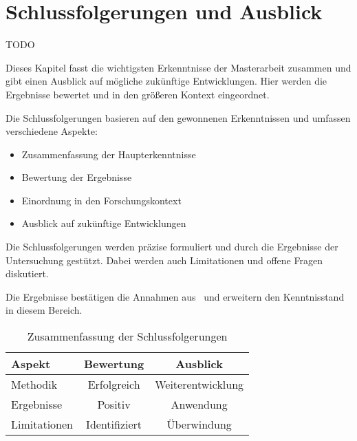 
\chapter{Schlussfolgerungen und Ausblick}\label{cha:conclusion}

TODO 

Dieses Kapitel fasst die wichtigsten Erkenntnisse der Masterarbeit zusammen und gibt einen Ausblick auf mögliche zukünftige Entwicklungen. 
Hier werden die Ergebnisse bewertet und in den größeren Kontext eingeordnet.

Die Schlussfolgerungen basieren auf den gewonnenen Erkenntnissen und umfassen verschiedene Aspekte:

\begin{itemize}[leftmargin=0.63cm, label=\textbullet]
    \item Zusammenfassung der Haupterkenntnisse
    \item Bewertung der Ergebnisse
    \item Einordnung in den Forschungskontext
    \item Ausblick auf zukünftige Entwicklungen
\end{itemize}

Die Schlussfolgerungen werden präzise formuliert und durch die Ergebnisse der Untersuchung gestützt. 
Dabei werden auch Limitationen und offene Fragen diskutiert.

Die Ergebnisse bestätigen die Annahmen aus~\cite{mustermann2023} und erweitern den Kenntnisstand in diesem Bereich.

\begin{table}[htbp]
    \centering
    \caption{Zusammenfassung der Schlussfolgerungen}
    \label{tab:schlussfolgerungen}
        \begin{tabular}{lcc}
        \toprule
        Aspekt & Bewertung & Ausblick \\
        \midrule
        Methodik & Erfolgreich & Weiterentwicklung \\
        Ergebnisse & Positiv & Anwendung \\
        Limitationen & Identifiziert & Überwindung \\
        \bottomrule
        \end{tabular}
\end{table}

